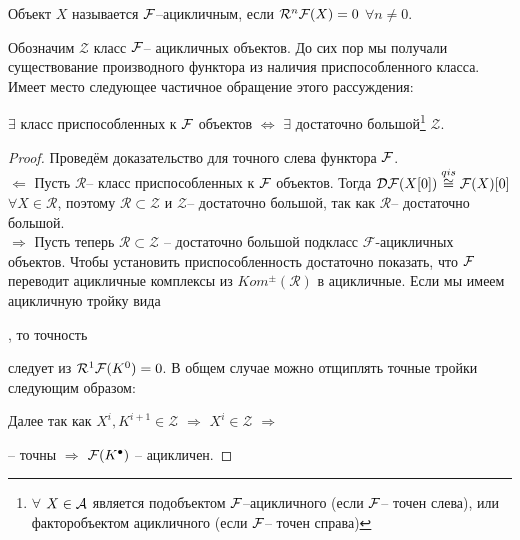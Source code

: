\documentclass[../main.tex]{subfiles}
\begin{document}
\begin{to_def}
Объект $X$ называется $\mathcal{F}$--ацикличным, если $\mathcal{R}^{n}\mathcal{F}(X) = 0$ $\forall n\neq 0$.
\end{to_def}
Обозначим $\mathcal{Z}$ класс $\mathcal{F}$-- ацикличных объектов. До сих пор мы получали существование производного функтора из наличия приспособленного класса. Имеет место следующее частичное обращение этого рассуждения:
\begin{to_claim}
$\exists$ класс приспособленных к $\mathcal{F}$ объектов $\Leftrightarrow$
    $\exists$ достаточно большой\footnote{$\forall$ $X \in \mathcal{A}$ является подобъектом $\mathcal{F}$--ацикличного (если $\mathcal{F}$-- точен слева), или факторобъектом ацикличного (если $\mathcal{F}$-- точен справа)} $\mathcal{Z}$.
\end{to_claim}
\begin{proof} Проведём доказательство для точного слева функтора $\mathcal{F}$.\\
$\Leftarrow$ Пусть $\mathcal{R}$-- класс приспособленных к $\mathcal{F}$ объектов. Тогда $\mathcal{D F}(X[0])\overset{qis}{\cong} \mathcal{F}(X)[0]$ $\forall X \in \mathcal{R}$, поэтому $\mathcal{R} \subset \mathcal{Z}$ и $\mathcal{Z}$-- достаточно большой, так как $\mathcal{R}$-- достаточно большой.\\
$\Rightarrow$ Пусть теперь $\mathcal{R} \subset \mathcal{Z}$ -- достаточно большой подкласс $\mathcal{F}$-ацикличных объектов. Чтобы установить приспособленность достаточно показать, что $\mathcal{F}$ переводит ацикличные комплексы из $Kom^{\pm}(\mathcal{R})$ в ацикличные. Если мы имеем ацикличную тройку вида , то точность  следует из $\mathcal{R}^1\mathcal{F}(K^0)=0$. В общем случае можно отщиплять точные тройки следующим образом:
\bee
{}
\eee
Далее так как $X^i, K^{i+1} \in \mathcal{Z}$ $\Rightarrow$ $X^i \in \mathcal{Z}$ $\Rightarrow$  -- точны $\Rightarrow$ $\mathcal{F}(K^\bullet)$ -- ацикличен.
\end{proof}
\end{document}
